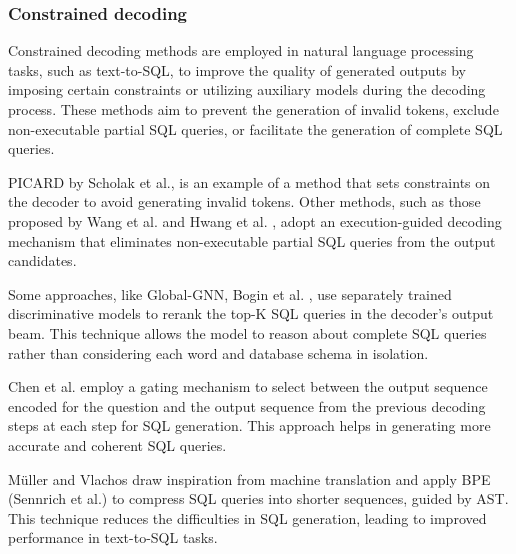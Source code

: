 \subsubsection{Constrained decoding}

Constrained decoding methods are employed in natural language processing tasks, such as text-to-SQL, to improve the quality of generated outputs by imposing certain constraints or utilizing auxiliary models during the decoding process. These methods aim to prevent the generation of invalid tokens, exclude non-executable partial SQL queries, or facilitate the generation of complete SQL queries.

PICARD by Scholak et al., \cite{Scholak2021:PICARD} is an example of a method that sets constraints on the decoder to avoid generating invalid tokens. Other methods, such as those proposed by Wang et al. \cite{wang2018robust} and Hwang et al. \cite{DBLP:journals/corr/abs-1902-01069}, adopt an execution-guided decoding mechanism that eliminates non-executable partial SQL queries from the output candidates.

Some approaches, like Global-GNN, Bogin et al. \cite{bogin-etal-2019-global}, use separately trained discriminative models to rerank the top-K SQL queries in the decoder's output beam. This technique allows the model to reason about complete SQL queries rather than considering each word and database schema in isolation.

Chen et al. \cite{chen-etal-2020-tale} employ a gating mechanism to select between the output sequence encoded for the question and the output sequence from the previous decoding steps at each step for SQL generation. This approach helps in generating more accurate and coherent SQL queries.

Müller and Vlachos \cite{müller2019bytepair} draw inspiration from machine translation and apply \ac{BPE} (Sennrich et al.\cite{sennrich-etal-2016-neural}) to compress SQL queries into shorter sequences, guided by AST. This technique reduces the difficulties in SQL generation, leading to improved performance in text-to-SQL tasks.

